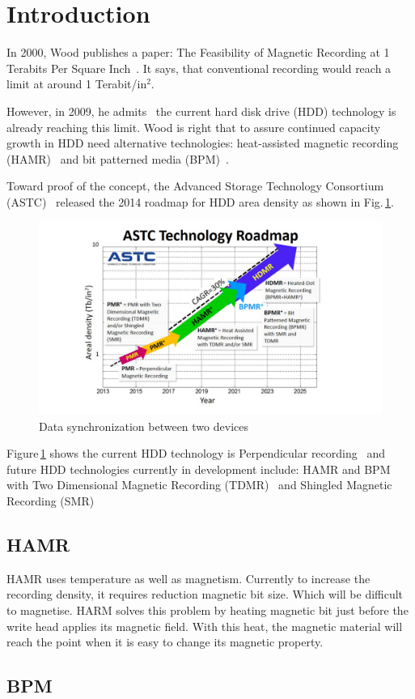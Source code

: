 \section{Introduction}
In 2000, Wood publishes a paper: The Feasibility of Magnetic Recording at 1 Terabits Per Square Inch~\cite{Wood2000}. It says, that conventional recording would reach a limit at around 1 Terabit/in$^2$.

However, in 2009, he admits~\cite{Wood2009} the current hard disk drive (HDD) technology is already reaching this limit. Wood is right that to assure continued capacity growth in HDD need alternative technologies: heat-assisted magnetic recording (HAMR)~\cite{Rottmeyer} and bit patterned media (BPM)~\cite{Terris}. 

Toward proof of the concept, the Advanced Storage Technology Consortium (ASTC)~\cite{ASTC} released the 2014 roadmap for HDD area density as shown in Fig.\,\ref{fig_astc}.

\begin{figure}[!hbt]
\includegraphics[height=0.25\textheight]{ASTC}
\caption{Data synchronization between two devices}
\label{fig_astc}
\end{figure}

Figure\,\ref{fig_astc} shows the current HDD technology is Perpendicular recording~\cite{HGST} and future HDD technologies currently in development include: HAMR and BPM with Two Dimensional Magnetic Recording (TDMR)~\cite{Krishnan} and Shingled Magnetic Recording (SMR)~\cite{Gibson}

\subsection{HAMR} 
HAMR uses temperature as well as magnetism. Currently to increase the recording density, it requires reduction magnetic bit size. Which will be difficult to magnetise. HARM solves this problem by heating magnetic bit just before the write head applies its magnetic field. With this heat, the magnetic material will reach the point when it is easy to change its magnetic property.
\subsection{BPM}



